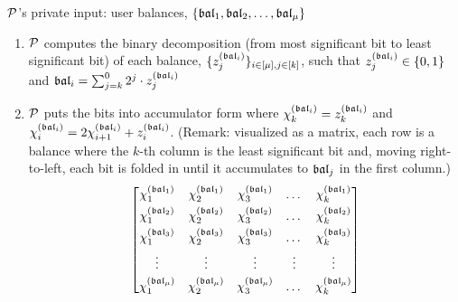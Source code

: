 

\begin{Protocol*}[t!]
\begin{framed}
\footnotesize


$\mathcal{P}$'s private input: user balances, $\{\mathfrak{bal}_1,\mathfrak{bal}_2,\dots,\mathfrak{bal}_\mu\}$
\begin{enumerate}
        \item $\mathcal{P}$ computes the binary decomposition (from most significant bit to least significant bit) of each balance, $\{z_j^{(\mathfrak{bal}_i)}\}_{i\in[\mu],j\in[k]}$, such that $z_j^{(\mathfrak{bal}_i)}\in\{0,1\}$ and $\mathfrak{bal}_i=\sum_{j=k}^{0}2^j\cdot{z_j^{(\mathfrak{bal}_i)}}$
        \item $\mathcal{P}$ puts the bits into accumulator form where $\chi_k^{(\mathfrak{bal}_i)}=z_k^{(\mathfrak{bal}_i)}$ and $\chi_i^{(\mathfrak{bal}_i)}=2\chi_{i+1}^{(\mathfrak{bal}_i)}+z_i^{(\mathfrak{bal}_i)}$.  (Remark: visualized as a matrix, each row is a balance where the $k$-th column is the least significant bit and, moving right-to-left, each bit is folded in until it accumulates to $\mathfrak{bal}_j$ in the first column.)
        \[\begin{bmatrix}
            \chi_1^{(\mathfrak{bal}_1)} & \chi_2^{(\mathfrak{bal}_1)} & \chi_3^{(\mathfrak{bal}_1)} & \dots & \chi_k^{(\mathfrak{bal}_1)} \\[3pt]
            \chi_1^{(\mathfrak{bal}_2)} & \chi_2^{(\mathfrak{bal}_2)} & \chi_3^{(\mathfrak{bal}_2)} & \dots & \chi_k^{(\mathfrak{bal}_2)} \\[3pt]
            \chi_1^{(\mathfrak{bal}_3)} & \chi_2^{(\mathfrak{bal}_3)} & \chi_3^{(\mathfrak{bal}_3)} & \dots & \chi_k^{(\mathfrak{bal}_3)} \\[3pt]
            \vdots & \vdots & \vdots & \vdots & \vdots \\[3pt]
            \chi_1^{(\mathfrak{bal}_\mu)} & \chi_2^{(\mathfrak{bal}_\mu)} & \chi_3^{(\mathfrak{bal}_\mu)} & \dots & \chi_k^{(\mathfrak{bal}_\mu)}
        \end{bmatrix}\]
        

\end{enumerate}
\end{framed}
\end{Protocol*}
